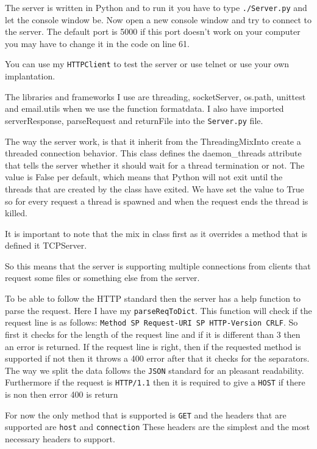 \documentclass{sig-alternate-05-2015}
\begin{document}
The server is written in Python and to run it you have to type \texttt{./Server.py} and let the console window be. Now open a new console window and try to connect to the server. The default port is 5000 if this port doesn't work on your computer you may have to change it in the code on line 61.

You can use my \texttt{HTTPClient} to test the server or use telnet or use your own implantation. 

The libraries and frameworks I use are threading, socketServer, os.path, unittest and email.utils when we use the function formatdata. I also have imported serverResponse, parseRequest and returnFile into the \texttt{Server.py} file.

The way the server work, is that it inherit from the ThreadingMixInto create a threaded connection behavior. This class defines the daemon\_threads attribute that tells the server whether it should wait for a thread termination or not. The value is False per default, which means that Python will not exit until the threads that are created by the class have exited. We have set the value to True so for every request a thread is spawned and when the request ends the thread is killed.

It is important to note that the mix in class first as it overrides a method that is defined it TCPServer.

So this means that the server is supporting multiple connections from clients that request some files or something else from the server.

To be able to follow the HTTP standard then the server has a help function to parse the request. Here I have my \texttt{parseReqToDict}. This function will check if the request line is as follows: \texttt{Method SP Request-URI SP HTTP-Version CRLF}. So first it checks for the length of the request line and if it is different than 3 then an error is returned. If the request line is right, then if the requested method is supported if not then it throws a 400 error after that it checks for the separators.
The way we split the data follows the \texttt{JSON} standard for an pleasant readability.
Furthermore if the request is \texttt{HTTP/1.1} then it is required to give a \texttt{HOST} if there is non then error 400 is return

For now the only method that is supported is \texttt{GET} and the headers that are supported are \texttt{host} and \texttt{connection}
These headers are the simplest and the most necessary headers to support. 
\end{document}
